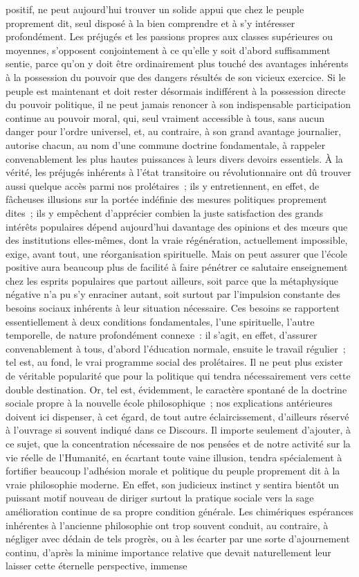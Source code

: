\documentclass[french,twoside]{book} %
\begin{document}
positif, ne peut aujourd’hui trouver un solide appui que chez le peuple proprement dit, seul disposé à la bien comprendre et à s’y intéresser profondément. Les préjugés et les passions propres aux classes supérieures ou moyennes, s’opposent conjointement à ce qu’elle y soit d’abord suffisamment sentie, parce qu’on y doit être ordinairement plus touché des avantages inhérents à la possession du pouvoir que des dangers résultés de son vicieux exercice. Si le peuple est maintenant et doit rester désormais indifférent à la possession directe du pouvoir politique, il ne peut jamais renoncer à son indispensable participation continue au pouvoir moral, qui, seul vraiment accessible à tous, sans aucun danger pour l’ordre universel, et, au contraire, à son grand avantage journalier, autorise chacun, au nom d’une commune doctrine fondamentale, à rappeler convenablement les plus hautes puissances à leurs divers devoirs essentiels. À la vérité, les préjugés inhérents à l’état transitoire ou révolutionnaire ont dû trouver aussi quelque accès parmi nos prolétaires ; ils y entretiennent, en effet, de fâcheuses illusions sur la portée indéfinie des mesures politiques proprement dites ; ils y empêchent d’apprécier combien la juste satisfaction des grands intérêts populaires dépend aujourd’hui davantage des opinions et des mœurs que des institutions elles-mêmes, dont la vraie régénération, actuellement impossible, exige, avant tout, une réorganisation spirituelle. Mais on peut assurer que l’école positive aura beaucoup plus de facilité à faire pénétrer ce salutaire enseignement chez les esprits populaires que partout ailleurs, soit parce que la métaphysique négative n’a pu s’y enraciner autant, soit surtout par l’impulsion constante des besoins sociaux inhérents à leur situation nécessaire. Ces besoins se rapportent essentiellement à deux conditions fondamentales, l’une spirituelle, l’autre temporelle, de nature profondément connexe : il s’agit, en effet, d’assurer convenablement à tous, d’abord l’éducation normale, ensuite le travail régulier ; tel est, au fond, le vrai programme social des prolétaires. Il ne peut plus exister de véritable popularité que pour la politique qui tendra nécessairement vers cette double destination. Or, tel est, évidemment, le caractère spontané de la doctrine sociale propre à la nouvelle école philosophique ; nos explications antérieures doivent ici dispenser, à cet égard, de tout autre éclaircissement, d’ailleurs réservé à l’ouvrage si souvent indiqué dans ce Discours. Il importe seulement d’ajouter, à ce sujet, que la concentration nécessaire de nos pensées et de notre activité sur la vie réelle de l’Humanité, en écartant toute vaine illusion, tendra spécialement à fortifier beaucoup l’adhésion morale et politique du peuple proprement dit à la vraie philosophie moderne. En effet, son judicieux instinct y sentira bientôt un puissant motif nouveau de diriger surtout la pratique sociale vers la sage amélioration continue de sa propre condition générale. Les chimériques espérances inhérentes à l’ancienne philosophie ont trop souvent conduit, au contraire, à négliger avec dédain de tels progrès, ou à les écarter par une sorte d’ajournement continu, d’après la minime importance relative que devait naturellement leur laisser cette éternelle perspective, immense 
\end{document}
